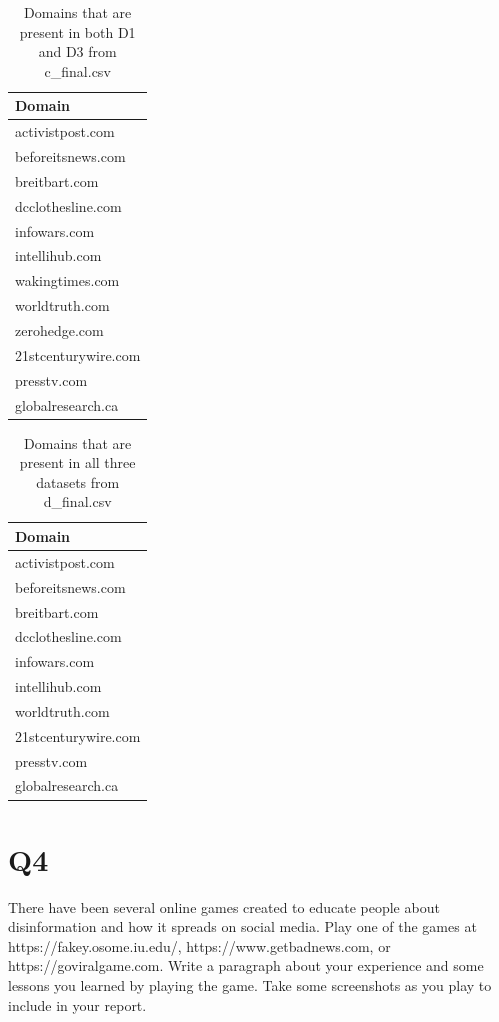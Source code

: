 \documentclass[12pt]{article}
\begin{document}
\begin{table}[ht]
\centering
\caption{Domains that are present in both D1 and D3 from c\_final.csv}
\label{tb5}
\begin{tabular}{|l|}
\hline
\textbf{Domain} \\ \hline \hline
activistpost.com\\ \hline
beforeitsnews.com\\ \hline
breitbart.com \\ \hline
dcclothesline.com \\ \hline
infowars.com \\ \hline
intellihub.com \\ \hline
wakingtimes.com \\ \hline
worldtruth.com \\ \hline
zerohedge.com \\ \hline
21stcenturywire.com \\ \hline
presstv.com \\ \hline
globalresearch.ca \\ \hline
\end{tabular}
\end{table}
\clearpage
\begin{table}[ht]
\centering
\caption{Domains that are present in all three datasets from d\_final.csv}
\label{tb6}
\begin{tabular}{|l|}
\hline
\textbf{Domain} \\ \hline \hline
activistpost.com\\ \hline
beforeitsnews.com\\ \hline
breitbart.com \\ \hline
dcclothesline.com \\ \hline
infowars.com \\ \hline
intellihub.com \\ \hline
worldtruth.com \\ \hline
21stcenturywire.com \\ \hline
presstv.com \\ \hline
globalresearch.ca \\ \hline
\end{tabular}
\end{table}




\section*{Q4}
There have been several online games created to educate people about disinformation and how it spreads on social media. Play one of the games at https://fakey.osome.iu.edu/, https://www.getbadnews.com, or https://goviralgame.com. Write a paragraph about your experience and some lessons you learned by playing the game. Take some screenshots as you play to include in your report.
\clearpage
\end{document}
